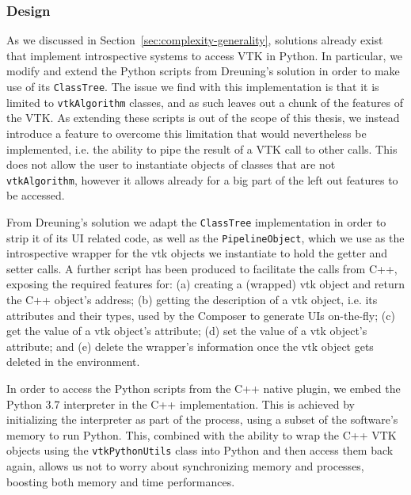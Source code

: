 \subsubsection{Design}

As we discussed in Section~\ref{sec:complexity-generality}, solutions already exist that implement introspective systems to access VTK in Python. In particular, we modify and extend the Python scripts from Dreuning's solution in order to make use of its \verb|ClassTree|. The issue we find with this implementation is that it is limited to \verb|vtkAlgorithm| classes, and as such leaves out a chunk of the features of the VTK. As extending these scripts is out of the scope of this thesis, we instead introduce a feature to overcome this limitation that would nevertheless be implemented, i.e. the ability to pipe the result of a VTK call to other calls. This does not allow the user to instantiate objects of classes that are not \verb|vtkAlgorithm|, however it allows already for a big part of the left out features to be accessed.

From Dreuning's solution we adapt the \verb|ClassTree| implementation in order to strip it of its UI related code, as well as the \verb|PipelineObject|, which we use as the introspective wrapper for the \acrshort{vtk} objects we instantiate to hold the getter and setter calls. A further script has been produced to facilitate the calls from C++, exposing the required features for: (a) creating a (wrapped) \acrshort{vtk} object and return the C++ object's address; (b) getting the description of a \acrshort{vtk} object, i.e. its attributes and their types, used by the Composer to generate UIs on-the-fly; (c) get the value of a \acrshort{vtk} object's attribute; (d) set the value of a \acrshort{vtk} object's attribute; and (e) delete the wrapper's information once the \acrshort{vtk} object gets deleted in the environment. 

In order to access the Python scripts from the C++ native plugin, we embed the Python 3.7 interpreter in the C++ implementation. This is achieved by initializing the interpreter as part of the process, using a subset of the software's memory to run Python. This, combined with the ability to wrap the C++ VTK objects using the \verb|vtkPythonUtils| class into Python and then access them back again, allows us not to worry about synchronizing memory and processes, boosting both memory and time performances.

